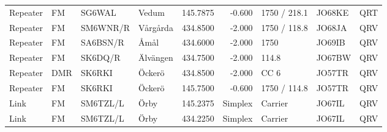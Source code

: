 \begin{longtable}{llllrrlll}
Repeater & FM        & SG6WAL   & Vedum             & 145.7875     & -0.600     & 1750 / 218.1 & JO68KE      & QRT      \\
Repeater & FM        & SM6WNR/R & Vårgårda          & 434.8500     & -2.000     & 1750 / 118.8 & JO68JA      & QRV      \\
Repeater & FM        & SA6BSN/R & Åmål              & 434.6000     & -2.000     & 1750         & JO69IB      & QRV      \\
Repeater & FM        & SK6DQ/R  & Älvängen          & 434.7500     & -2.000     & 114.8        & JO67BW      & QRV      \\
Repeater & DMR       & SK6RKI   & Öckerö            & 434.8500     & -2.000     & CC 6         & JO57TR      & QRV      \\
Repeater & FM        & SK6RKI   & Öckerö            & 145.7500     & -0.600     & 1750 / 114.8 & JO57TR      & QRV      \\
Link     & FM        & SM6TZL/L & Örby              & 145.2375     & Simplex    & Carrier      & JO67IL      & QRV      \\
Link     & FM        & SM6TZL/L & Örby              & 434.2250     & Simplex    & Carrier      & JO67IL      & QRV      \\
\end{longtable}
\normalsize

\clearpage

